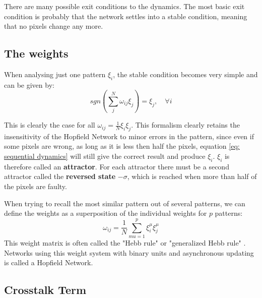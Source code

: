 There are many possible exit conditions to the dynamics. The most basic exit condition is probably that the network settles into a stable condition, meaning that no pixels change any more. 

\subsection{The weights}
When analysing just one pattern $\xi_i$, the stable condition becomes very simple and can be given by:
\begin{equation}
sgn\left( \sum_j^N \omega_{ij} \xi_j \right) = \xi_j, \quad	\forall i
\end{equation}

This is clearly the case for all $\omega_{ij}=\frac{1}{N} \xi_i \xi_j$. This formalism clearly retains the insensitivity of the Hopfield Network to minor errors in the pattern, since even if some pixels are wrong, as long as it is less then half the pixels, equation \ref{eq: sequential dynamics} will still give the correct result and produce $\xi_i$. $\xi_i$ is therefore called an \textbf{attractor}. For each attractor there must be a second attractor called the \textbf{reversed state} $-\sigma$, which is reached when more than half of the pixels are faulty. 

When trying to recall the most similar pattern out of several patterns, we can define the weights as a superposition of the individual weights for $p$ patterns:
\begin{equation}
\omega_{ij}=\frac{1}{N} \sum_{mu=1}^p \xi_i^\mu \xi_j^\mu
\end{equation}
This weight matrix is often called the "Hebb rule" or "generalized Hebb rule" \citep{Polk:2002fk}. Networks using this weight system with binary units and asynchronous updating is called a Hopfield Network. 

\subsection{Crosstalk Term}


